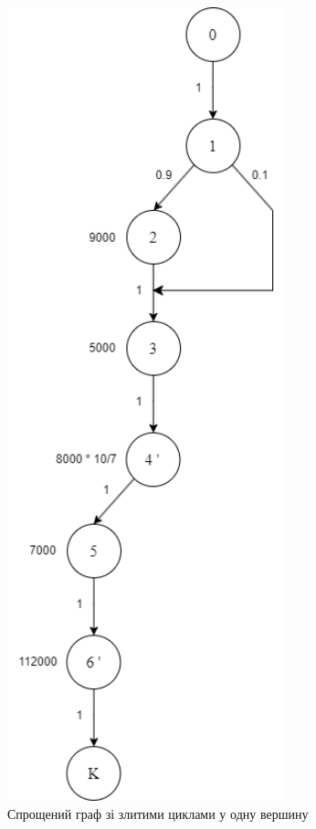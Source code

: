 \begin{figure}[h!]
    \centering
    \includegraphics[width=8cm]{reports/algos/lab1/assets/9.png}
    \caption{Спрощений граф зі злитими циклами у одну вершину}
\end{figure}

